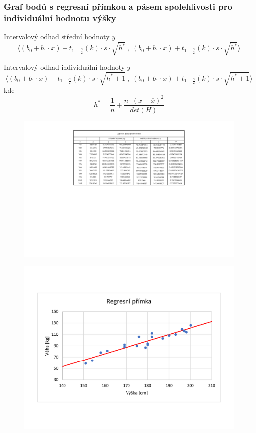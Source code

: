\subsubsection*{Graf bodů s regresní přímkou a pásem spolehlivosti pro individuální hodnotu výšky}

\begin{compactitem}
    \item Intervalový odhad střední hodnoty $y$
    $${\displaystyle \Big\langle (b_0 + b_1 \cdot x) - t_{1 - \frac{\alpha}{2}}(k) \cdot s \cdot \sqrt{h^*} \;,\; (b_0 + b_1 \cdot x) + t_{1 - \frac{\alpha}{2}}(k) \cdot s \cdot \sqrt{h^*} \Big\rangle}$$

    \item Intervalový odhad individuální hodnoty $y$
    $${\displaystyle \Big\langle (b_0 + b_1 \cdot x) - t_{1 - \frac{\alpha}{2}}(k) \cdot s \cdot \sqrt{h^* + 1} \;,\; (b_0 + b_1 \cdot x) + t_{1 - \frac{\alpha}{2}}(k) \cdot s \cdot \sqrt{h^* + 1} \Big\rangle}$$
    kde
    $${\displaystyle h^* = \frac{1}{n} + \frac{n \cdot (x - \overline{x})^2}{det(H)}}$$
\end{compactitem}

\begin{figure}[H]
    \centering
    \includegraphics[width=1\linewidth]{2-c-1-crop.pdf}
\end{figure}
\bigskip

\begin{figure}[H]
    \centering
    \includegraphics[width=.9\linewidth]{2-c-2-crop.pdf}
\end{figure}
\bigskip

